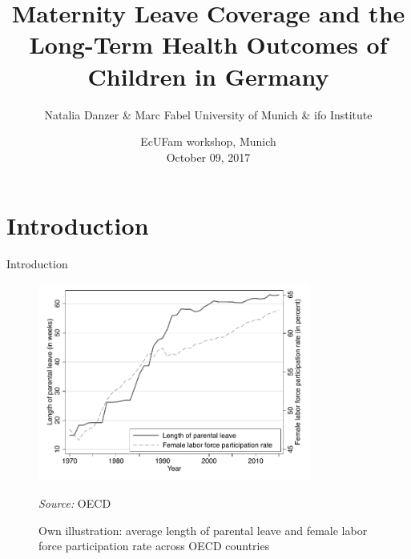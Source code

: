 \documentclass{beamer} %
\title[Maternity leave and long-run child health]{ \newline \textbf{Maternity Leave Coverage and the Long-Term Health Outcomes of Children in Germany}}
\author[Danzer \& Fabel]{Natalia Danzer \& Marc Fabel \newline University of Munich \& ifo Institute}
\date{EcUFam workshop, Munich\\October 09, 2017}
\begin{document}
\begin{frame}
	\titlepage
\end{frame}





\section{Introduction}
\begin{frame}{Introduction}

\begin{figure}\centering
\includegraphics[width=0.8\textwidth]{../analysis/graphs/SOEP/PL_OECD.pdf}
\caption{Own illustration: average length of parental leave and female labor force participation rate across OECD countries}\vspace{-0.3cm}
\begin{minipage}{\textwidth} %
{\footnotesize \textit{Source: }OECD}
\end{minipage}
\end{figure}

\end{frame}
\end{document}

